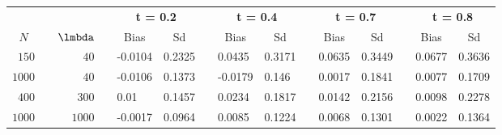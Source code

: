 \begin{table}[!tbp]
\begin{center}
\begin{tabular}{rcrcllcllcllcll}
\hline\hline
\multicolumn{1}{c}{\bfseries }&\multicolumn{1}{c}{\bfseries }&\multicolumn{1}{c}{\bfseries }&\multicolumn{1}{c}{\bfseries }&\multicolumn{2}{c}{\bfseries t = 0.2}&\multicolumn{1}{c}{\bfseries }&\multicolumn{2}{c}{\bfseries t = 0.4}&\multicolumn{1}{c}{\bfseries }&\multicolumn{2}{c}{\bfseries t = 0.7}&\multicolumn{1}{c}{\bfseries }&\multicolumn{2}{c}{\bfseries t = 0.8}\tabularnewline
\cline{5-6} \cline{8-9} \cline{11-12} \cline{14-15}
\multicolumn{1}{c}{$N$}&\multicolumn{1}{c}{}&\multicolumn{1}{c}{$\lmbda$}&\multicolumn{1}{c}{}&\multicolumn{1}{c}{Bias}&\multicolumn{1}{c}{Sd}&\multicolumn{1}{c}{}&\multicolumn{1}{c}{Bias}&\multicolumn{1}{c}{Sd}&\multicolumn{1}{c}{}&\multicolumn{1}{c}{Bias}&\multicolumn{1}{c}{Sd}&\multicolumn{1}{c}{}&\multicolumn{1}{c}{Bias}&\multicolumn{1}{c}{Sd}\tabularnewline
\hline
$ 150$&&$  40$&&-0.0104&0.2325&&0.0435&0.3171&&0.0635&0.3449&&0.0677&0.3636\tabularnewline
$1000$&&$  40$&&-0.0106&0.1373&&-0.0179&0.146&&0.0017&0.1841&&0.0077&0.1709\tabularnewline
$ 400$&&$ 300$&&0.01&0.1457&&0.0234&0.1817&&0.0142&0.2156&&0.0098&0.2278\tabularnewline
$1000$&&$1000$&&-0.0017&0.0964&&0.0085&0.1224&&0.0068&0.1301&&0.0022&0.1364\tabularnewline
\hline
\end{tabular}\end{center}
\end{table}
